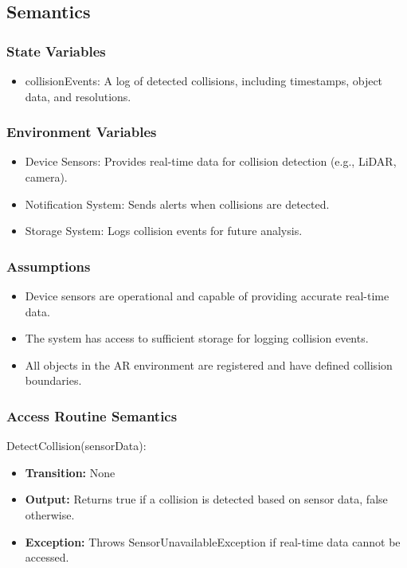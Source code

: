 \documentclass[12pt, titlepage]{article}
\begin{document}
\subsection{Semantics}

\subsubsection{State Variables}

\begin{itemize}
    \item collisionEvents: A log of detected collisions, including timestamps, object data, and resolutions.
\end{itemize}

\subsubsection{Environment Variables}

\begin{itemize}
    \item Device Sensors: Provides real-time data for collision detection (e.g., LiDAR, camera).
    \item Notification System: Sends alerts when collisions are detected.
    \item Storage System: Logs collision events for future analysis.
\end{itemize}

\subsubsection{Assumptions}

\begin{itemize}
    \item Device sensors are operational and capable of providing accurate real-time data.
    \item The system has access to sufficient storage for logging collision events.
    \item All objects in the AR environment are registered and have defined collision boundaries.
\end{itemize}

\subsubsection{Access Routine Semantics}

\noindent DetectCollision(sensorData):
\begin{itemize}
    \item \textbf{Transition:} None
    \item \textbf{Output:} Returns true if a collision is detected based on sensor data, false otherwise.
    \item \textbf{Exception:} Throws SensorUnavailableException if real-time data cannot be accessed.
\end{itemize}
\end{document}
